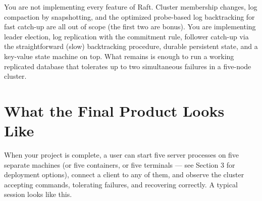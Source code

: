 \documentclass[11pt,a4paper]{article}
\begin{document}
You are not implementing every feature of Raft. Cluster membership changes, log compaction by snapshotting, and the optimized probe-based log backtracking for fast catch-up are all out of scope (the first two are bonus). You are implementing leader election, log replication with the commitment rule, follower catch-up via the straightforward (slow) backtracking procedure, durable persistent state, and a key-value state machine on top. What remains is enough to run a working replicated database that tolerates up to two simultaneous failures in a five-node cluster.

\section{What the Final Product Looks Like}

When your project is complete, a user can start five server processes on five separate machines (or five containers, or five terminals --- see Section 3 for deployment options), connect a client to any of them, and observe the cluster accepting commands, tolerating failures, and recovering correctly. A typical session looks like this.
\end{document}
